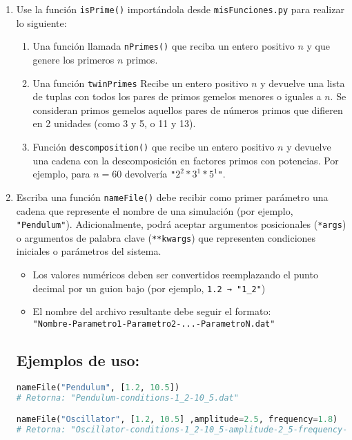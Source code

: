 \documentclass[12pt]{article}
\begin{document}
\begin{enumerate}[label=\textbf{\arabic*.}]
\item Use la función \texttt{isPrime()} importándola desde \texttt{misFunciones.py} para realizar lo siguiente:

\begin{enumerate}[label=\alph*)]

\item Una función llamada \texttt{nPrimes()} que reciba un entero positivo $n$ y que genere los primeros $n$ primos.
\item Una función \texttt{twinPrimes} Recibe un entero positivo $n$ y devuelve una lista de tuplas con todos los pares de primos gemelos menores o iguales a $n$. Se consideran primos gemelos aquellos pares de números primos que difieren en 2 unidades (como 3 y 5, o 11 y 13).
\item Función \texttt{descomposition()} que recibe un entero positivo $n$ y devuelve una cadena con la descomposición en factores primos con potencias. Por ejemplo, para $n = 60$ devolvería \texttt{"$2^2 * 3^1 * 5^1$"}. 

\end{enumerate}

\item Escriba una función \texttt{nameFile()} debe recibir como primer parámetro una cadena que represente el nombre de una simulación (por ejemplo, \texttt{"Pendulum"}). Adicionalmente, podrá aceptar argumentos posicionales (\texttt{*args}) o argumentos de palabra clave (\texttt{**kwargs}) que representen condiciones iniciales o parámetros del sistema.


\begin{itemize}
    \item Los valores numéricos deben ser convertidos reemplazando el punto decimal por un guion bajo (por ejemplo, \texttt{1.2 → "1\_2"})
    \item El nombre del archivo resultante debe seguir el formato:\\ \texttt{"Nombre-Parametro1-Parametro2-...-ParametroN.dat"}
\end{itemize}

\subsection*{Ejemplos de uso:}

\begin{lstlisting}[language=Python]
nameFile("Pendulum", [1.2, 10.5]) 
# Retorna: "Pendulum-conditions-1_2-10_5.dat"

nameFile("Oscillator", [1.2, 10.5] ,amplitude=2.5, frequency=1.8) 
# Retorna: "Oscillator-conditions-1_2-10_5-amplitude-2_5-frequency-1_8.dat"
\end{lstlisting}


\end{enumerate}
\end{document}
